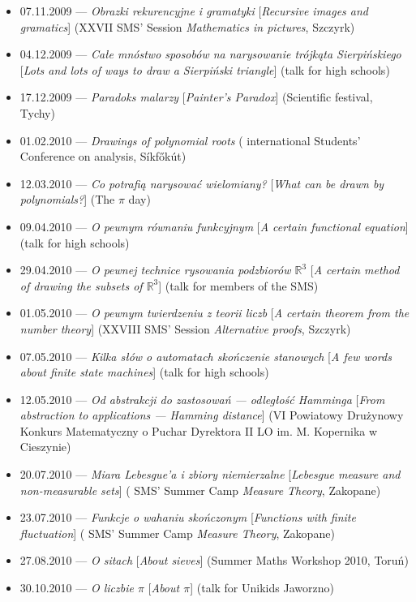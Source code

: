 \begin{itemize}
  \item 07.11.2009 --- \textsl{Obrazki rekurencyjne i gramatyki} [\textsl{Recursive images and gramatics}] (XXVII SMS' Session \textsl{Mathematics in pictures}, Szczyrk)
  \item 04.12.2009 --- \textsl{Całe mnóstwo sposobów na narysowanie trójkąta Sierpińskiego} [\textsl{Lots and lots of ways to draw a Sierpiński triangle}] (talk for high schools)
  \item 17.12.2009 --- \textsl{Paradoks malarzy} [\textsl{Painter's Paradox}] (Scientific festival, Tychy)
  \item 01.02.2010 --- \textsl{Drawings of polynomial roots} ( international Students' Conference on analysis, Síkfőkút)
  \item 12.03.2010 --- \textsl{Co potrafią narysować wielomiany?} [\textsl{What can be drawn by polynomials?}] (The $\pi$ day)
  \item 09.04.2010 --- \textsl{O pewnym równaniu funkcyjnym} [\textsl{A certain functional equation}] (talk for high schools)
  \item 29.04.2010 --- \textsl{O pewnej technice rysowania podzbiorów $\mathbb{R}^3$} [\textsl{A certain method of drawing the subsets of $\mathbb{R}^3$}] (talk for members of the SMS)
  \item 01.05.2010 --- \textsl{O pewnym twierdzeniu z teorii liczb} [\textsl{A certain theorem from the number theory}] (XXVIII SMS' Session \textsl{Alternative proofs}, Szczyrk)
  \item 07.05.2010 --- \textsl{Kilka słów o automatach skończenie stanowych} [\textsl{A few words about finite state machines}] (talk for high schools)
  \item 12.05.2010 --- \textsl{Od abstrakcji do zastosowań --- odległość Hamminga} [\textsl{From abstraction to applications --- Hamming distance}] (VI Powiatowy Drużynowy Konkurs Matematyczny o Puchar Dyrektora II LO im. M. Kopernika w Cieszynie)
  \item 20.07.2010 --- \textsl{Miara Lebesgue'a i zbiory niemierzalne} [\textsl{Lebesgue measure and non-measurable sets}] ( SMS' Summer Camp \textsl{Measure Theory}, Zakopane)
  \item 23.07.2010 --- \textsl{Funkcje o wahaniu skończonym} [\textsl{Functions with finite fluctuation}] ( SMS' Summer Camp \textsl{Measure Theory}, Zakopane)
  \item 27.08.2010 --- \textsl{O sitach} [\textsl{About sieves}] (Summer Maths Workshop 2010, Toruń)
  \item 30.10.2010 --- \textsl{O liczbie $\pi$} [\textsl{About $\pi$}] (talk for Unikids Jaworzno)

\end{itemize}
